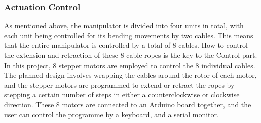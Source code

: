 \subsubsection{Actuation Control}
As mentioned above, the manipulator is divided into four units in total, with each unit being controlled for its 
bending movements by two cables. This means that the entire manipulator is controlled by a total of 8 cables. How 
to control the extension and retraction of these 8 cable ropes is the key to the Control part. \\
In this project, 8 stepper motors are employed to control the 8 individual cables. The planned design involves 
wrapping the cables around the rotor of each motor, and the stepper motors are programmed to extend or retract 
the ropes by stepping a certain number of steps in either a counterclockwise or clockwise direction. These 8 motors 
are connected to an Arduino board together, and the user can control the programme by a keyboard, and a serial monitor. 
